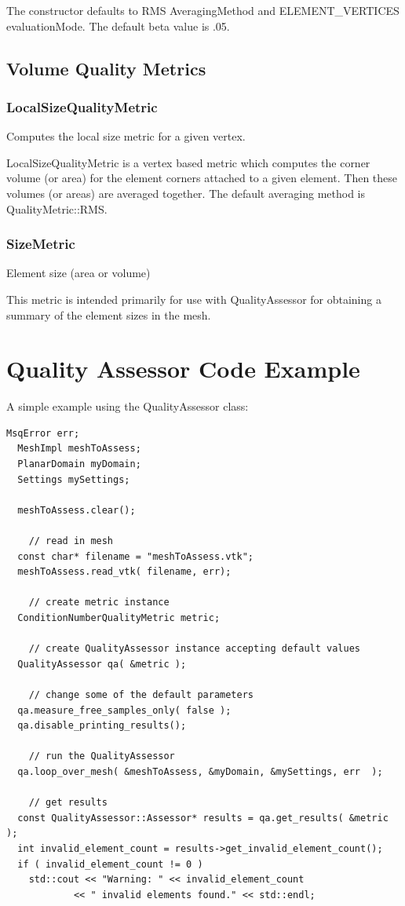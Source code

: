 The constructor defaults to RMS AveragingMethod and ELEMENT\_VERTICES evaluationMode.  The default beta value is .05.

\subsection{Volume Quality Metrics}

\subsubsection{LocalSizeQualityMetric}
       
  Computes the local size metric for a given vertex.
       
  LocalSizeQualityMetric is a vertex based metric which computes the corner volume (or area) for the element corners attached to a given element.  Then these volumes (or areas) are averaged together.  The default averaging method is QualityMetric::RMS. 

\subsubsection{SizeMetric}

Element size (area or volume)

This metric is intended primarily for use with QualityAssessor for obtaining a summary of the element sizes in the mesh.



\clearpage
\section{Quality Assessor Code Example}

A simple example using the QualityAssessor class:

\begin{lstlisting}[frame=single]
  MsqError err;
  MeshImpl meshToAssess;
  PlanarDomain myDomain;
  Settings mySettings;

  meshToAssess.clear();

    // read in mesh
  const char* filename = "meshToAssess.vtk";
  meshToAssess.read_vtk( filename, err);

    // create metric instance
  ConditionNumberQualityMetric metric;

    // create QualityAssessor instance accepting default values
  QualityAssessor qa( &metric );

    // change some of the default parameters
  qa.measure_free_samples_only( false );
  qa.disable_printing_results();

    // run the QualityAssessor
  qa.loop_over_mesh( &meshToAssess, &myDomain, &mySettings, err	 );

    // get results
  const QualityAssessor::Assessor* results = qa.get_results( &metric );
  int invalid_element_count = results->get_invalid_element_count();
  if ( invalid_element_count != 0 )
    std::cout << "Warning: " << invalid_element_count
			<< " invalid elements found." << std::endl;
\end{lstlisting}

